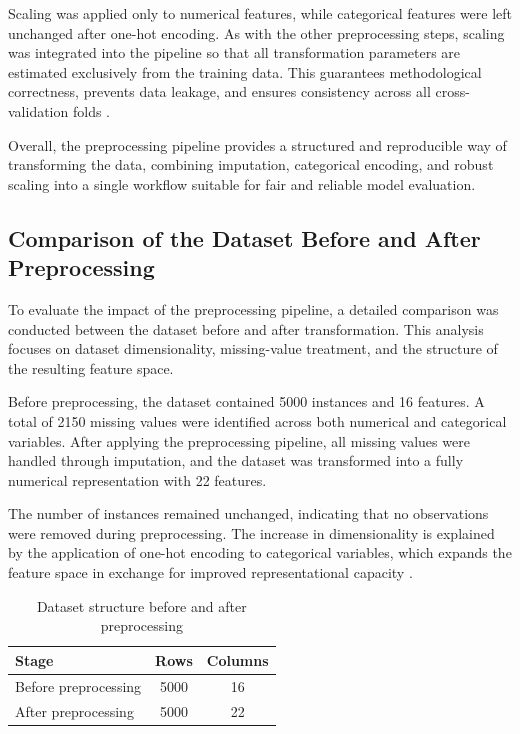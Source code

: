 Scaling was applied only to numerical features, while categorical features were left unchanged after one-hot encoding. As with the other preprocessing steps, scaling was integrated into the pipeline so that all transformation parameters are estimated exclusively from the training data. This guarantees methodological correctness, prevents data leakage, and ensures consistency across all cross-validation folds \cite{hastie2009model_assessment}.

Overall, the preprocessing pipeline provides a structured and reproducible way of transforming the data, combining imputation, categorical encoding, and robust scaling into a single workflow suitable for fair and reliable model evaluation.

\subsection{Comparison of the Dataset Before and After Preprocessing}

To evaluate the impact of the preprocessing pipeline, a detailed comparison was conducted between the dataset before and after transformation. This analysis focuses on dataset dimensionality, missing-value treatment, and the structure of the resulting feature space.

Before preprocessing, the dataset contained 5000 instances and 16 features. A total of 2150 missing values were identified across both numerical and categorical variables. After applying the preprocessing pipeline, all missing values were handled through imputation, and the dataset was transformed into a fully numerical representation with 22 features.

The number of instances remained unchanged, indicating that no observations were removed during preprocessing. The increase in dimensionality is explained by the application of one-hot encoding to categorical variables, which expands the feature space in exchange for improved representational capacity \cite{hastie2009high_dimensional}.

\begin{table}[t]
\centering
\caption{Dataset structure before and after preprocessing}
\begin{tabular}{lcc}
\toprule
\textbf{Stage} & \textbf{Rows} & \textbf{Columns} \\
\midrule
Before preprocessing & 5000 & 16 \\
After preprocessing  & 5000 & 22 \\
\bottomrule
\end{tabular}
\end{table}

